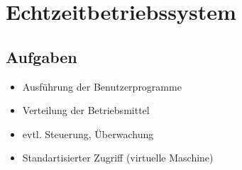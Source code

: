\section{Echtzeitbetriebssystem}

\subsection{Aufgaben}
\begin{itemize}
	\item Ausführung der Benutzerprogramme
	\item Verteilung der Betriebsmittel
	\item evtl. Steuerung, Überwachung
	\item Standartisierter Zugriff (virtuelle Maschine)
\end{itemize}

